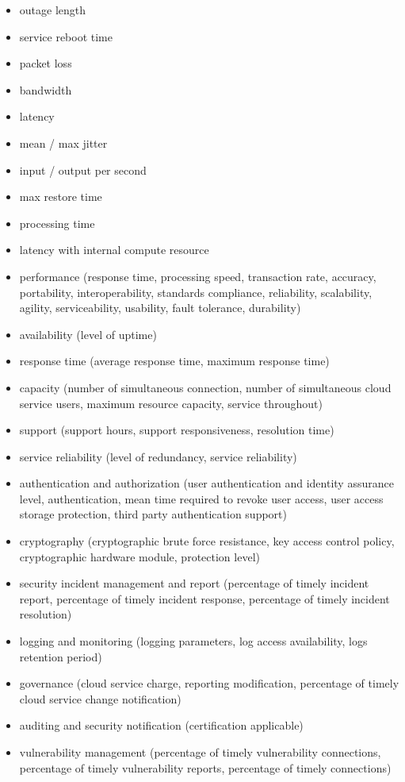 \documentclass[12pt,a4paper,oneside]{report}
\begin{document}
\begin{itemize}
\item outage length
\item service reboot time
\item packet loss
\item bandwidth
\item latency
\item mean / max jitter
\item input / output per second
\item max restore time
\item processing time
\item latency with internal compute resource
\item performance (response time, processing speed, transaction rate, accuracy, portability, interoperability, standards compliance, reliability, scalability, agility, serviceability, usability, fault tolerance, durability)
\item availability (level of uptime)
\item response time (average response time, maximum response time)
\item capacity (number of simultaneous connection, number of simultaneous cloud service users, maximum resource capacity, service throughout)
\item support (support hours, support responsiveness, resolution time)
\item service reliability (level of redundancy, service reliability)
\item authentication and authorization (user authentication and identity assurance level, authentication, mean time required to revoke user access, user access storage protection, third party authentication support)
\item cryptography (cryptographic brute force resistance, key access control policy, cryptographic hardware module, protection level)
\item security incident management and report (percentage of timely incident report, percentage of timely incident response, percentage of timely incident resolution)
\item logging and monitoring (logging parameters, log access availability, logs retention period)
\item governance (cloud service charge, reporting modification, percentage of timely cloud service change notification)
\item auditing and security notification (certification applicable)
\item vulnerability management (percentage of timely vulnerability connections, percentage of timely vulnerability reports, percentage of timely connections)

\end{itemize}
\end{document}

